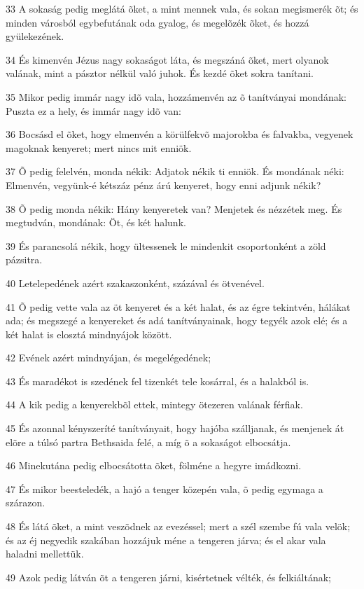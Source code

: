 \par 33 A sokaság pedig meglátá õket, a mint mennek vala, és sokan megismerék õt; és minden városból egybefutának oda gyalog, és megelõzék õket, és hozzá gyülekezének.
\par 34 És kimenvén Jézus nagy sokaságot láta, és megszáná õket, mert olyanok valának, mint a pásztor nélkül való juhok. És kezdé õket sokra tanítani.
\par 35 Mikor pedig immár nagy idõ vala, hozzámenvén az õ tanítványai mondának: Puszta ez a hely, és immár nagy idõ van:
\par 36 Bocsásd el õket, hogy elmenvén a körülfekvõ majorokba és falvakba, vegyenek magoknak kenyeret; mert nincs mit enniök.
\par 37 Õ pedig felelvén, monda nékik: Adjatok nékik ti enniök. És mondának néki: Elmenvén, vegyünk-é kétszáz pénz árú kenyeret, hogy enni adjunk nékik?
\par 38 Õ pedig monda nékik: Hány kenyeretek van? Menjetek és nézzétek meg. És megtudván, mondának: Öt, és két halunk.
\par 39 És parancsolá nékik, hogy ültessenek le mindenkit csoportonként a zöld pázsitra.
\par 40 Letelepedének azért szakaszonként, százával és ötvenével.
\par 41 Õ pedig vette vala az öt kenyeret és a két halat, és az égre tekintvén, hálákat ada; és megszegé a kenyereket és adá tanítványainak, hogy tegyék azok elé; és a két halat is elosztá mindnyájok között.
\par 42 Evének azért mindnyájan, és megelégedének;
\par 43 És maradékot is szedének fel tizenkét tele kosárral, és a halakból is.
\par 44 A kik pedig a kenyerekbõl ettek, mintegy ötezeren valának férfiak.
\par 45 És azonnal kényszeríté tanítványait, hogy hajóba szálljanak, és menjenek át elõre a túlsó partra Bethsaida felé, a míg õ a sokaságot elbocsátja.
\par 46 Minekutána pedig elbocsátotta õket, fölméne a hegyre imádkozni.
\par 47 És mikor beesteledék, a hajó a tenger közepén vala, õ pedig egymaga a szárazon.
\par 48 És látá õket, a mint veszõdnek az evezéssel; mert a szél szembe fú vala velök; és az éj negyedik szakában hozzájuk méne a tengeren járva; és el akar vala haladni mellettük.
\par 49 Azok pedig látván õt a tengeren járni, kisértetnek vélték, és felkiáltának;
